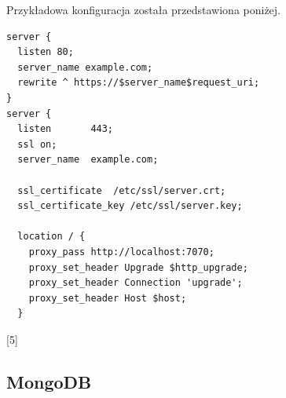 \documentclass[8pt,a4paper,notitlepage]{article}
\begin{document}
\par Przykładowa konfiguracja została przedstawiona poniżej.

\begin{lstlisting}
server {
  listen 80;
  server_name example.com;
  rewrite ^ https://$server_name$request_uri;
}
server {
  listen       443;
  ssl on;
  server_name  example.com;

  ssl_certificate  /etc/ssl/server.crt;
  ssl_certificate_key /etc/ssl/server.key;

  location / {
    proxy_pass http://localhost:7070;
    proxy_set_header Upgrade $http_upgrade;
    proxy_set_header Connection 'upgrade';
    proxy_set_header Host $host;
  }
\end{lstlisting}
[5]

\subsection{MongoDB}
\end{document}

